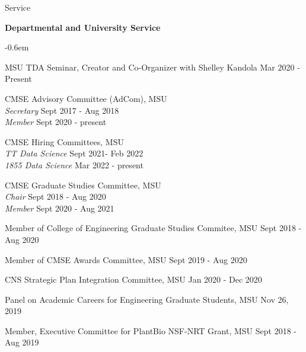 \documentclass{resume} %
\begin{document}
\begin{rSection}{Service}



\textbf{Departmental and University Service}
\begin{list}{}{\leftmargin=1em}
   \itemsep -0.6em \vspace{-0.5em} %

\item
MSU TDA Seminar, Creator and Co-Organizer with Shelley Kandola  \hfill Mar 2020 - Present

\item
CMSE Advisory Committee (AdCom), MSU\\
\phantom{xxx} \textit{Secretary} \hfill  Sept 2017 - Aug 2018\\
\phantom{xxx} \textit{Member} \hfill Sept 2020 - present

\item CMSE Hiring Committees, MSU \\
\phantom{xxx} \textit{TT Data Science} \hfill  Sept 2021- Feb 2022\\
\phantom{xxx} \textit{1855 Data Science } \hfill Mar 2022 - present

\item
CMSE Graduate Studies Committee, MSU
\\
\phantom{xxx} \textit{Chair} \hfill  Sept 2018 - Aug 2020\\
\phantom{xxx} \textit{Member} \hfill Sept 2020 - Aug 2021
\item
Member of College of Engineering Graduate Studies Commitee, MSU \hfill Sept 2018 - Aug 2020
\item
Member of CMSE Awards Committee, MSU \hfill Sept 2019 - Aug 2020
\item
CNS Strategic Plan Integration Committee, MSU \hfill Jan 2020 - Dec 2020
\item
Panel on Academic Careers for Engineering Graduate Students, MSU \hfill Nov 26, 2019
\item Member, Executive Committee for PlantBio NSF-NRT Grant, MSU
\hfill Sept 2018 - Aug 2019


\end{list}
\end{rSection}
\end{document}
